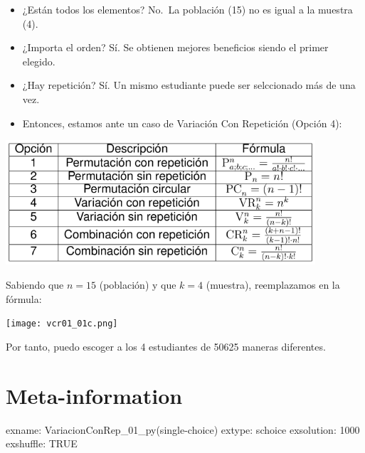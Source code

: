 \documentclass[
]{article}
\providecommand{\tightlist}{%
  \setlength{\itemsep}{0pt}\setlength{\parskip}{0pt}}
\begin{document}
\hfill\break

\begin{itemize}
\tightlist
\item
  ¿Están todos los elementos? No.~La población (15) no es igual a la
  muestra (4).
\item
  ¿Importa el orden? Sí. Se obtienen mejores beneficios siendo el primer
  elegido.
\item
  ¿Hay repetición? Sí. Un mismo estudiante puede ser selccionado más de
  una vez.
\item
  Entonces, estamos ante un caso de Variación Con Repetición (Opción 4):
\end{itemize}

\hfill\break

\includegraphics[width=11.5cm,height=\textheight]{vcr01_01b.png}

\hfill\break

Sabiendo que \(n=15\) (población) y que \(k=4\) (muestra), reemplazamos
en la fórmula:

\texttt{[image: vcr01\_01c.png]}

\hfill\break

Por tanto, puedo escoger a los 4 estudiantes de 50625 maneras
diferentes.

\hypertarget{meta-information}{%
\section{Meta-information}\label{meta-information}}

exname: VariacionConRep\_01\_py(single-choice) extype: schoice
exsolution: 1000 exshuffle: TRUE
\end{document}
